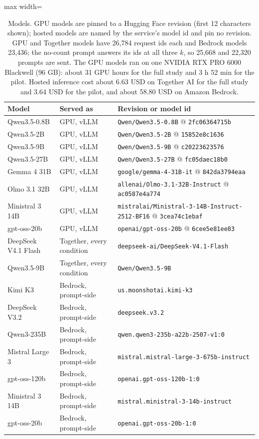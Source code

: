 \begin{table}[t]
  \centering
  \small
  \begin{adjustbox}{max width=\linewidth}
  \begin{tabular}{@{}lll@{}}
    \toprule
    Model & Served as & Revision or model id \\
    \midrule
    Qwen3.5-0.8B & GPU, vLLM & \texttt{Qwen/Qwen3.5-0.8B} @ \texttt{2fc06364715b} \\
    Qwen3.5-2B & GPU, vLLM & \texttt{Qwen/Qwen3.5-2B} @ \texttt{15852e8c1636} \\
    Qwen3.5-9B & GPU, vLLM & \texttt{Qwen/Qwen3.5-9B} @ \texttt{c20223623576} \\
    Qwen3.5-27B & GPU, vLLM & \texttt{Qwen/Qwen3.5-27B} @ \texttt{fc05daec18b0} \\
    Gemma 4 31B & GPU, vLLM & \texttt{google/gemma-4-31B-it} @ \texttt{842da3794eaa} \\
    Olmo 3.1 32B & GPU, vLLM & \texttt{allenai/Olmo-3.1-32B-Instruct} @ \texttt{ac0587e4a774} \\
    Ministral 3 14B & GPU, vLLM & \texttt{mistralai/Ministral-3-14B-Instruct-2512-BF16} @ \texttt{3cea74c1ebaf} \\
    gpt-oss-20b & GPU, vLLM & \texttt{openai/gpt-oss-20b} @ \texttt{6cee5e81ee83} \\
    \midrule
    DeepSeek V4.1 Flash & Together, every condition & \texttt{deepseek-ai/DeepSeek-V4.1-Flash} \\
    Qwen3.5-9B & Together, every condition & \texttt{Qwen/Qwen3.5-9B} \\
    Kimi K3 & Bedrock, prompt-side & \texttt{us.moonshotai.kimi-k3} \\
    DeepSeek V3.2 & Bedrock, prompt-side & \texttt{deepseek.v3.2} \\
    Qwen3-235B & Bedrock, prompt-side & \texttt{qwen.qwen3-235b-a22b-2507-v1:0} \\
    Mistral Large 3 & Bedrock, prompt-side & \texttt{mistral.mistral-large-3-675b-instruct} \\
    gpt-oss-120b & Bedrock, prompt-side & \texttt{openai.gpt-oss-120b-1:0} \\
    Ministral 3 14B & Bedrock, prompt-side & \texttt{mistral.ministral-3-14b-instruct} \\
    gpt-oss-20b & Bedrock, prompt-side & \texttt{openai.gpt-oss-20b-1:0} \\
    \bottomrule
  \end{tabular}
  \end{adjustbox}
  \caption{Models. GPU models are pinned to a Hugging Face revision (first 12 characters shown); hosted models are named by the service's model id and pin no revision. GPU and Together models have 26,784 request ids each and Bedrock models 23,436; the no-count prompt answers its ids at all three $k$, so 25,668 and 22,320 prompts are sent. The GPU models ran on one NVIDIA RTX PRO 6000 Blackwell (96 GB): about 31 GPU hours for the full study and 3 h 52 min for the pilot. Hosted inference cost about 6.63 USD on Together AI for the full study and 3.64 USD for the pilot, and about 58.80 USD on Amazon Bedrock.}
  \label{tab:models}
\end{table}

